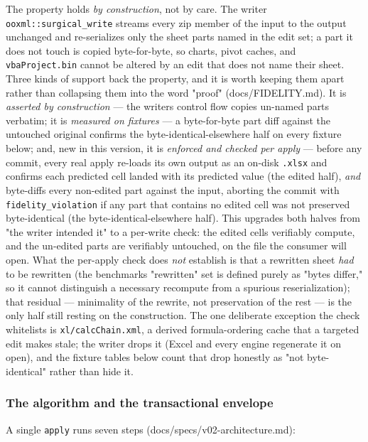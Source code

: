 \documentclass[
]{article}
\begin{document}
The property holds \emph{by construction}, not by care. The writer
\texttt{ooxml::surgical\_write} streams every zip member of the input to
the output unchanged and re-serializes only the sheet parts named in the
edit set; a part it does not touch is copied byte-for-byte, so charts,
pivot caches, and \texttt{vbaProject.bin} cannot be altered by an edit
that does not name their sheet. Three kinds of support back the
property, and it is worth keeping them apart rather than collapsing them
into the word "proof" (docs/FIDELITY.md). It is \emph{asserted by
construction} --- the writer\textquotesingle s control flow copies
un-named parts verbatim; it is \emph{measured on fixtures} --- a
byte-for-byte part diff against the untouched original confirms the
byte-identical-elsewhere half on every fixture below; and, new in this
version, it is \emph{enforced and checked per apply} --- before any
commit, every real apply re-loads its own output as an on-disk
\texttt{.xlsx} and confirms each predicted cell landed with its
predicted value (the edited half), \emph{and} byte-diffs every
non-edited part against the input, aborting the commit with
\texttt{fidelity\_violation} if any part that contains no edited cell
was not preserved byte-identical (the byte-identical-elsewhere half).
This upgrades both halves from "the writer intended it" to a per-write
check: the edited cells verifiably compute, and the un-edited parts are
verifiably untouched, on the file the consumer will open. What the
per-apply check does \emph{not} establish is that a rewritten sheet
\emph{had} to be rewritten (the benchmark\textquotesingle s "rewritten"
set is defined purely as "bytes differ," so it cannot distinguish a
necessary recompute from a spurious reserialization); that residual ---
minimality of the rewrite, not preservation of the rest --- is the only
half still resting on the construction. The one deliberate exception the
check whitelists is \texttt{xl/calcChain.xml}, a derived
formula-ordering cache that a targeted edit makes stale; the writer
drops it (Excel and every engine regenerate it on open), and the fixture
tables below count that drop honestly as "not byte-identical" rather
than hide it.

\subsubsection{The algorithm and the transactional
envelope}\label{the-algorithm-and-the-transactional-envelope}

A single \texttt{apply} runs seven steps
(docs/specs/v02-architecture.md):
\end{document}
